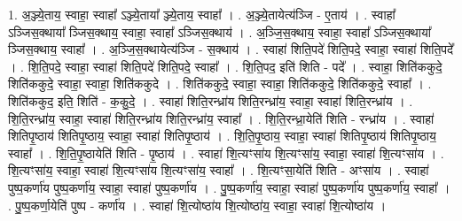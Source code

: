 \documentclass[17pt]{extarticle}
\begin{document}
1. अ॒ञ्ज्ये॒ताय॒ स्वाहा॒ स्वाहा᳚ ऽञ्ज्ये॒ताया᳚ ञ्ज्ये॒ताय॒ स्वाहा᳚ । . अ॒ञ्ज्ये॒तायेत्य॑ञ्जि - ए॒ताय॑ । . स्वाहा᳚ ऽञ्जिस॒क्थाया᳚ ञ्जिस॒क्थाय॒ स्वाहा॒ स्वाहा᳚ ऽञ्जिस॒क्थाय॑ । . अ॒ञ्जि॒स॒क्थाय॒ स्वाहा॒ स्वाहा᳚ ऽञ्जिस॒क्थाया᳚ ञ्जिस॒क्थाय॒ स्वाहा᳚ । . अ॒ञ्जि॒स॒क्थायेत्य॑ञ्जि - स॒क्थाय॑ । . स्वाहा॑ शिति॒पदे॑ शिति॒पदे॒ स्वाहा॒ स्वाहा॑ शिति॒पदे᳚ । . शि॒ति॒पदे॒ स्वाहा॒ स्वाहा॑ शिति॒पदे॑ शिति॒पदे॒ स्वाहा᳚ । . शि॒ति॒पद॒ इति॑ शिति - पदे᳚ । . स्वाहा॒ शिति॑ककुदे॒ शिति॑ककुदे॒ स्वाहा॒ स्वाहा॒ शिति॑ककुदे । . शिति॑ककुदे॒ स्वाहा॒ स्वाहा॒ शिति॑ककुदे॒ शिति॑ककुदे॒ स्वाहा᳚ । . शिति॑ककुद॒ इति॒ शिति॑ - क॒कु॒दे॒ । . स्वाहा॑ शिति॒रन्ध्रा॑य शिति॒रन्ध्रा॑य॒ स्वाहा॒ स्वाहा॑ शिति॒रन्ध्रा॑य । . शि॒ति॒रन्ध्रा॑य॒ स्वाहा॒ स्वाहा॑ शिति॒रन्ध्रा॑य शिति॒रन्ध्रा॑य॒ स्वाहा᳚ । . शि॒ति॒रन्ध्रा॒येति॑ शिति - रन्ध्रा॑य । . स्वाहा॑ शितिपृ॒ष्ठाय॑ शितिपृ॒ष्ठाय॒ स्वाहा॒ स्वाहा॑ शितिपृ॒ष्ठाय॑ । . शि॒ति॒पृ॒ष्ठाय॒ स्वाहा॒ स्वाहा॑ शितिपृ॒ष्ठाय॑ शितिपृ॒ष्ठाय॒ स्वाहा᳚ । . शि॒ति॒पृ॒ष्ठायेति॑ शिति - पृ॒ष्ठाय॑ । . स्वाहा॑ शि॒त्यꣳसा॑य शि॒त्यꣳसा॑य॒ स्वाहा॒ स्वाहा॑ शि॒त्यꣳसा॑य । . शि॒त्यꣳसा॑य॒ स्वाहा॒ स्वाहा॑ शि॒त्यꣳसा॑य शि॒त्यꣳसा॑य॒ स्वाहा᳚ । . शि॒त्यꣳसा॒येति॑ शिति - अꣳसा॑य । . स्वाहा॑ पुष्प॒कर्णा॑य पुष्प॒कर्णा॑य॒ स्वाहा॒ स्वाहा॑ पुष्प॒कर्णा॑य । . पु॒ष्प॒कर्णा॑य॒ स्वाहा॒ स्वाहा॑ पुष्प॒कर्णा॑य पुष्प॒कर्णा॑य॒ स्वाहा᳚ । . पु॒ष्प॒कर्णा॒येति॑ पुष्प - कर्णा॑य । . स्वाहा॑ शि॒त्योष्ठा॑य शि॒त्योष्ठा॑य॒ स्वाहा॒ स्वाहा॑ शि॒त्योष्ठा॑य । \newline
\end{document}
